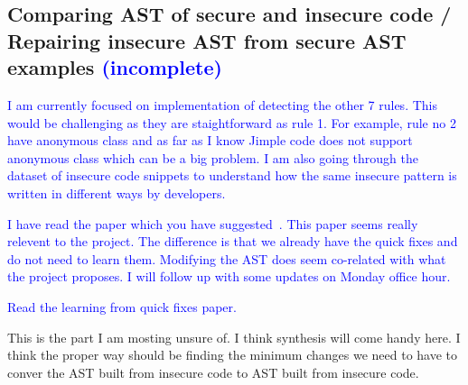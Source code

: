 \documentclass[sigconf]{acmart}
\begin{document}

\subsection{Comparing AST of secure and insecure code / Repairing insecure AST from secure AST examples \textcolor{blue}{(incomplete)}}
\textcolor{blue}{
I am currently focused on implementation of detecting the other 7 rules. This would be challenging as they are staightforward as rule 1. For example, rule no 2 have anonymous class and as far as I know Jimple code does not support  anonymous class which can be a big problem. I am also going through the dataset of insecure code snippets to understand how the same insecure pattern is written in different ways by developers.} 

\textcolor{blue}{
I have read the paper which you have suggested~\cite{rolim2018learning}. This paper seems really relevent to the project. The difference is that we already have the quick fixes and do not need to learn them. Modifying the AST does seem co-related with what the project proposes. I will follow up with some updates on Monday office hour.}

\iffalse
\textcolor{blue}{Read the learning from quick fixes paper.}

This is the part I am mosting unsure of. I think synthesis will come handy here. 
I think the proper way should be finding the minimum changes we need to have to conver the AST built from insecure code to AST built from insecure code.  
\end{document}
